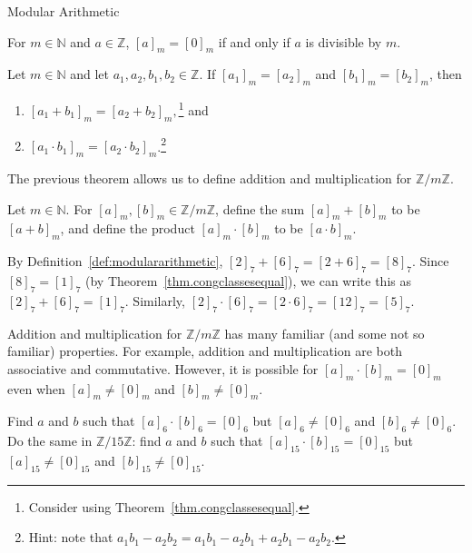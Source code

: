 \begin{section}{Modular Arithmetic}
\begin{theorem}\label{thm.divisibleiffzeromod}
For  $m\in \mathbb{N}$ and $a\in \mathbb{Z}$, $[a]_m = [0]_m$ if and only if $a$ is divisible by $m$.
\end{theorem}

\begin{theorem}
Let $m\in \mathbb{N}$ and let $a_1,a_2,b_1,b_2 \in \mathbb{Z}$. If $[a_1]_m = [a_2]_m$ and $[b_1]_m = [b_2]_m$, then 
\begin{enumerate}[label=\textrm{(\alph*)}]
\item $[a_1+b_1]_m = [a_2+b_2]_m,$\footnote{Consider using Theorem~\ref{thm.congclassesequal}.} and
\item $[a_1\cdot b_1]_m = [a_2\cdot b_2]_m$.\footnote{Hint: note that $a_1b_1-a_2b_2 = a_1b_1 -a_2b_1 + a_2b_1-a_2b_2$.}
\end{enumerate}
\end{theorem}

The previous theorem allows us to define addition and multiplication for $\mathbb{Z}/m\mathbb{Z}$. 

\begin{definition}\label{def:modulararithmetic}
Let $m\in \mathbb{N}$. For $[a]_m, [b]_m \in \mathbb{Z}/m\mathbb{Z}$, define the sum $[a]_m + [b]_m$ to be $[a+b]_m$, and define the product $[a]_m \cdot [b]_m$ to be $ [a\cdot b]_m$.
\end{definition}

\begin{example}
By Definition~\ref{def:modulararithmetic}, $[2]_7+[6]_7 = [2+6]_7 = [8]_7$. Since $[8]_7 = [1]_7$ (by Theorem~\ref{thm.congclassesequal}), we can write this as $[2]_7+[6]_7 = [1]_7$. Similarly, $[2]_7\cdot[6]_7 = [2\cdot6]_7 = [12]_7 = [5]_7$.
\end{example}

Addition and multiplication for $\mathbb{Z}/m\mathbb{Z}$ has many familiar (and some not so familiar) properties. For example, addition and multiplication are both associative and commutative. However, it is possible for $[a]_m\cdot[b]_m = [0]_m$ even when $[a]_m \neq [0]_m$ and $[b]_m \neq [0]_m$.

\begin{exercise}
Find $a$ and $b$ such that $[a]_6\cdot[b]_6 = [0]_6$ but $[a]_6 \neq [0]_6$ and $[b]_6 \neq [0]_6$. Do the same in $\mathbb{Z}/15\mathbb{Z}$: find $a$ and $b$ such that $[a]_{15}\cdot[b]_{15} = [0]_{15}$ but $[a]_{15} \neq [0]_{15}$ and $[b]_{15} \neq [0]_{15}$.
\end{exercise}


\end{section}
